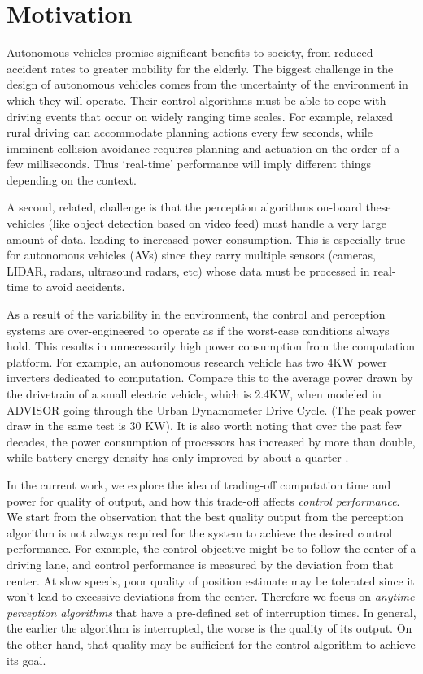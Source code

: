 \section{Motivation}
\label{sec:motivation}

Autonomous vehicles promise significant benefits to society, from reduced accident rates to greater mobility for the elderly. 
The biggest challenge in the design of autonomous vehicles comes from the uncertainty of the environment in which they will operate. 
Their control algorithms must be able to cope with driving events that occur on widely ranging time scales. 
For example, relaxed rural driving can accommodate planning actions every few seconds, while imminent collision avoidance requires planning and actuation on the order of a few milliseconds.
Thus `real-time' performance will imply different things depending on the context. 

A second, related, challenge is that the perception algorithms on-board these vehicles (like object detection based on video feed) must handle a very large amount of data, leading to increased power consumption. 
This is especially true for autonomous vehicles (AVs) since they carry multiple sensors (cameras, LIDAR, radars, ultrasound radars, etc) whose data must be processed in real-time to avoid accidents.

As a result of the variability in the environment, the control and perception systems are over-engineered to operate as if the worst-case conditions always hold. 
This results in unnecessarily high power consumption from the computation platform. 
For example, an autonomous research vehicle has two 4KW power inverters dedicated to computation.
Compare this to the average power drawn by the drivetrain of a small electric vehicle, which is 2.4KW, when modeled  in ADVISOR \cite{nreladvisor} going through the Urban Dynamometer Drive Cycle.
(The peak power draw in the same test is 30 KW).
It is also worth noting that over the past few decades, the power consumption of processors has increased by more than double, while battery energy density has only improved by about a quarter \cite{Lahiri}. 

In the current work, we explore the idea of trading-off computation time and power for quality of output, and how this trade-off affects \emph{control performance}.
We start from the observation that the best quality output from the perception algorithm is not always required for the system to achieve the desired control performance.
For example, the control objective might be to follow the center of a driving lane, and control performance is measured by the deviation from that center.
At slow speeds, poor quality of position estimate may be tolerated since it won't lead to excessive deviations from the center.
Therefore we focus on \emph{anytime perception algorithms} that have a pre-defined set of interruption times. 
In general, the earlier the algorithm is interrupted, the worse is the quality of its output. 
On the other hand, that quality may be sufficient for the control algorithm to achieve its goal.

